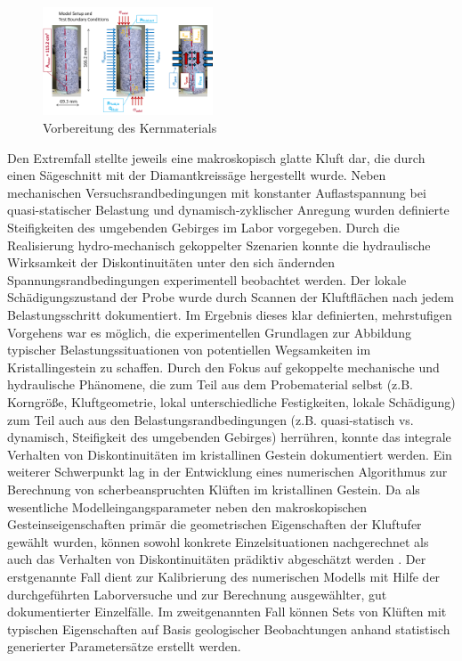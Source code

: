 \begin{figure}
\includegraphics[width=0.45\textwidth]{figures/geomint-wp3-11.png}
\caption{Vorbereitung des Kernmaterials}
\label{fig:wp3-results-tubaf}
\end{figure}
Den Extremfall stellte jeweils eine makroskopisch glatte Kluft dar, die durch einen Sägeschnitt mit der Diamantkreissäge hergestellt wurde. 
Neben mechanischen Versuchsrandbedingungen mit konstanter Auflastspannung bei quasi-statischer Belastung und dynamisch-zyklischer Anregung wurden definierte Steifigkeiten des umgebenden Gebirges im Labor vorgegeben. Durch die Realisierung hydro-mechanisch gekoppelter Szenarien konnte die hydraulische Wirksamkeit der Diskontinuitäten unter den sich ändernden Spannungsrandbedingungen experimentell beobachtet werden. Der lokale Schädigungszustand der Probe wurde durch Scannen der Kluftflächen nach jedem Belastungsschritt dokumentiert. Im Ergebnis dieses klar definierten, mehrstufigen Vorgehens war es möglich, die experimentellen Grundlagen zur Abbildung typischer Belastungssituationen von potentiellen Wegsamkeiten im Kristallingestein zu schaffen.
Durch den Fokus auf gekoppelte mechanische und hydraulische Phänomene, die zum Teil aus dem Probematerial selbst (z.B. Korngröße, Kluftgeometrie, lokal unterschiedliche Festigkeiten, lokale Schädigung) zum Teil auch aus den Belastungsrandbedingungen (z.B. quasi-statisch vs. dynamisch, Steifigkeit des umgebenden Gebirges) herrühren, konnte das integrale Verhalten von Diskontinuitäten im kristallinen Gestein dokumentiert werden. 
%
Ein weiterer Schwerpunkt lag in der Entwicklung eines numerischen Algorithmus zur Berechnung von scherbeanspruchten Klüften im kristallinen Gestein. Da als wesentliche Modelleingangsparameter neben den makroskopischen Gesteinseigenschaften primär die geometrischen Eigenschaften der Kluftufer gewählt wurden, können sowohl konkrete Einzelsituationen nachgerechnet als auch das Verhalten von Diskontinuitäten prädiktiv abgeschätzt werden \cite{Poetschke2020}.
Der erstgenannte Fall dient zur Kalibrierung des numerischen Modells mit Hilfe der durchgeführten Laborversuche und zur Berechnung ausgewählter, gut dokumentierter Einzelfälle. Im zweitgenannten Fall können Sets von Klüften mit typischen Eigenschaften auf Basis geologischer Beobachtungen anhand statistisch generierter Parametersätze erstellt werden. 
